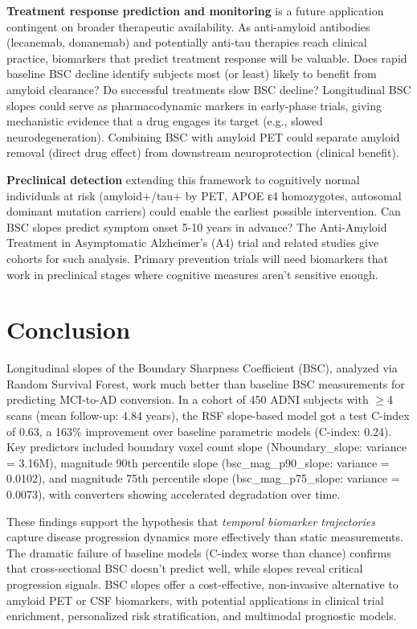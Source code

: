 \documentclass[blue]{ludusofficial}  %
\begin{document}
\textbf{Treatment response prediction and monitoring} is a future application contingent on broader therapeutic availability. As anti-amyloid antibodies (lecanemab, donanemab) and potentially anti-tau therapies reach clinical practice, biomarkers that predict treatment response will be valuable. Does rapid baseline BSC decline identify subjects most (or least) likely to benefit from amyloid clearance? Do successful treatments slow BSC decline? Longitudinal BSC slopes could serve as pharmacodynamic markers in early-phase trials, giving mechanistic evidence that a drug engages its target (e.g., slowed neurodegeneration). Combining BSC with amyloid PET could separate amyloid removal (direct drug effect) from downstream neuroprotection (clinical benefit).

\textbf{Preclinical detection} extending this framework to cognitively normal individuals at risk (amyloid+/tau+ by PET, APOE ε4 homozygotes, autosomal dominant mutation carriers) could enable the earliest possible intervention. Can BSC slopes predict symptom onset 5-10 years in advance? The Anti-Amyloid Treatment in Asymptomatic Alzheimer's (A4) trial and related studies give cohorts for such analysis. Primary prevention trials will need biomarkers that work in preclinical stages where cognitive measures aren't sensitive enough.

\section{Conclusion}

Longitudinal slopes of the Boundary Sharpness Coefficient (BSC), analyzed via Random Survival Forest, work much better than baseline BSC measurements for predicting MCI-to-AD conversion. In a cohort of 450 ADNI subjects with $\geq$4 scans (mean follow-up: 4.84 years), the RSF slope-based model got a test C-index of 0.63, a 163\% improvement over baseline parametric models (C-index: 0.24). Key predictors included boundary voxel count slope (Nboundary\_slope: variance = 3.16M), magnitude 90th percentile slope (bsc\_mag\_p90\_slope: variance = 0.0102), and magnitude 75th percentile slope (bsc\_mag\_p75\_slope: variance = 0.0073), with converters showing accelerated degradation over time.

These findings support the hypothesis that \textit{temporal biomarker trajectories} capture disease progression dynamics more effectively than static measurements. The dramatic failure of baseline models (C-index worse than chance) confirms that cross-sectional BSC doesn't predict well, while slopes reveal critical progression signals. BSC slopes offer a cost-effective, non-invasive alternative to amyloid PET or CSF biomarkers, with potential applications in clinical trial enrichment, personalized risk stratification, and multimodal prognostic models.
\end{document}
